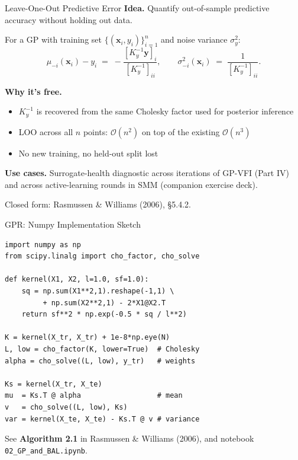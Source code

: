 \documentclass[aspectratio=169,11pt]{beamer}
\newcommand{\x}{\bm{x}}
\begin{document}
\begin{frame}{Leave-One-Out Predictive Error}
\textbf{Idea.} Quantify out-of-sample predictive accuracy without holding out data.

\smallskip
For a GP with training set $\{(\x_i, y_i)\}_{i=1}^n$ and noise variance $\sigma_y^2$:
\begin{equation*}
\mu_{-i}(\x_i) - y_i \;=\; -\frac{[K_y^{-1}\bm y]_i}{[K_y^{-1}]_{ii}}, \qquad
\sigma_{-i}^2(\x_i) \;=\; \frac{1}{[K_y^{-1}]_{ii}}.
\end{equation*}

\smallskip
\textbf{Why it's free.}
\begin{itemize}\itemsep0pt
  \item $K_y^{-1}$ is recovered from the same Cholesky factor used for posterior inference
  \item LOO across all $n$ points: $\mathcal{O}(n^2)$ on top of the existing $\mathcal{O}(n^3)$
  \item No new training, no held-out split lost
\end{itemize}

\smallskip
\textbf{Use cases.} Surrogate-health diagnostic across iterations of GP-VFI (Part IV) and across active-learning rounds in SMM (companion exercise deck).

\medskip
{\scriptsize Closed form: Rasmussen \& Williams (2006), \S5.4.2.}
\end{frame}

\begin{frame}[fragile]{GPR: Numpy Implementation Sketch}
\begin{lstlisting}[basicstyle=\footnotesize\ttfamily]
import numpy as np
from scipy.linalg import cho_factor, cho_solve

def kernel(X1, X2, l=1.0, sf=1.0):
    sq = np.sum(X1**2,1).reshape(-1,1) \
         + np.sum(X2**2,1) - 2*X1@X2.T
    return sf**2 * np.exp(-0.5 * sq / l**2)

K = kernel(X_tr, X_tr) + 1e-8*np.eye(N)
L, low = cho_factor(K, lower=True)  # Cholesky
alpha = cho_solve((L, low), y_tr)   # weights

Ks = kernel(X_tr, X_te)
mu  = Ks.T @ alpha                  # mean
v   = cho_solve((L, low), Ks)
var = kernel(X_te, X_te) - Ks.T @ v # variance
\end{lstlisting}

\vspace{0.2cm}
{\small See \textbf{Algorithm 2.1} in Rasmussen \& Williams (2006), and notebook \texttt{02\_GP\_and\_BAL.ipynb}.}
\end{frame}
\end{document}
